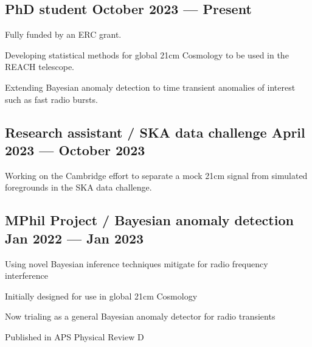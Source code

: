 \subsection{{PhD student \hfill October 2023 --- Present}}
\begin{zitemize}
\item Fully funded by an ERC grant.
\item Developing statistical methods for global 21cm Cosmology to be used in the REACH telescope.
\item Extending Bayesian anomaly detection to time transient anomalies of interest such as fast radio bursts.
\end{zitemize}

\subsection{{Research assistant / SKA data challenge \hfill April 2023 --- October 2023}}
\begin{zitemize}
\item Working on the Cambridge effort to separate a mock 21cm signal from simulated foregrounds in the SKA data challenge.
\end{zitemize}

\subsection{{MPhil Project / Bayesian anomaly detection \hfill Jan 2022 --- Jan 2023}}
\begin{zitemize}
\item Using novel Bayesian inference techniques mitigate for radio frequency interference
\item Initially designed for use in global 21cm Cosmology
\item Now trialing as a general Bayesian anomaly detector for radio transients
\item Published in APS Physical Review D
\end{zitemize}

